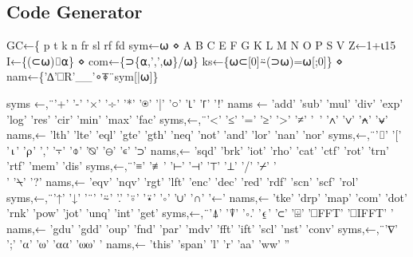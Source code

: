 \documentclass{article}%
\begin{document}
\subsection{Code Generator}

\nwenddocs{}\endmoddef\nwstartdeflinemarkup{}\nwenddeflinemarkup
GC←\{
        p t k n fr sl rf fd  sym←⍵ ⋄ A B C E F G K L M N O P S V Z←1+⍳15
        I←\{(⊂⍵)⌷⍺\} ⋄ com←\{⊃\{⍺,',',⍵\}/⍵\}
        ks←\{⍵⊂[0]⍨(⊃⍵)=⍵[;0]\} ⋄ nam←\{'∆'⎕R'__'∘⍕¨sym[|⍵]\}

        syms ←,¨'+'           '-'            '×'            '÷'            '*'             '⍟'           '|'              '○'           '⌊'          '⌈'           '!'
        nams ←        'add'    'sub'  'mul' 'div' 'exp' 'log' 'res'    'cir'   'min'  'max' 'fac'
        syms,←,¨'<'           '≤'          '='             '≥'           '>'             '≠'           '~'              '∧'           '∨'          '⍲'           '⍱'
        nams,←        'lth'    'lte'  'eql' 'gte' 'gth' 'neq' 'not'    'and'   'lor'  'nan' 'nor'
        syms,←,¨'⌷'                 '['            '⍳'           '⍴'           ','             '⍪'           '⌽'            '⍉'           '⊖'          '∊'           '⊃'
        nams,←        'sqd'    'brk'  'iot' 'rho' 'cat' 'ctf' 'rot'    'trn'   'rtf'  'mem' 'dis'
        syms,←,¨'≡'                 '≢'          '⊢'           '⊣'           '⊤'           '⊥'           '/'              '⌿'           '\\'            '⍀'           '?'
        nams,←        'eqv'    'nqv'  'rgt' 'lft' 'enc' 'dec' 'red'    'rdf'   'scn'  'scf' 'rol'
        syms,←,¨'↑'                 '↓'          '¨'            '⍨'           '.'             '⍤'           '⍣'            '∘'           '∪'          '∩'           '←'
        nams,←        'tke'    'drp'  'map' 'com' 'dot' 'rnk' 'pow'    'jot'   'unq'  'int' 'get'
        syms,←,¨'⍋'                 '⍒'          '∘.'  '⍷'           '⊂'           '⌹'           '⎕FFT' '⎕IFFT' '%
        nams,←        'gdu'    'gdd'  'oup' 'fnd' 'par' 'mdv' 'fft'    'ift'   'scl'  'nst' 'conv'
        syms,←,¨'∇'                 ';'            '⍺'           '⍵'           '⍺⍺'        '⍵⍵'        '%
        nams,←        'this' 'span' 'l'               'r'             'aa'    'ww'    ''
\end{document}
